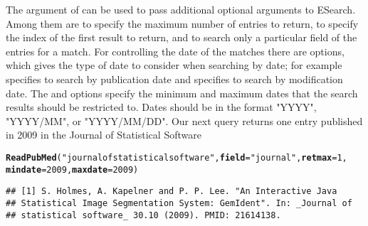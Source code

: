\documentclass[article]{jss}\usepackage[]{graphicx}\usepackage[]{color}
\makeatletter
\newcommand{\hlnum}[1]{\textcolor[rgb]{0.125,0.125,1}{#1}}%
\newcommand{\hlstr}[1]{\textcolor[rgb]{0.125,0.125,1}{#1}}%
\newcommand{\hlstd}[1]{\textcolor[rgb]{0.251,0.251,0.282}{#1}}%
\newcommand{\hlkwc}[1]{\textcolor[rgb]{0.529,0,0.184}{\textbf{#1}}}%
\newcommand{\hlkwd}[1]{\textcolor[rgb]{0.251,0.251,0.282}{\textbf{#1}}}%
\newenvironment{kframe}{%
 \def\at@end@of@kframe{}%
 \ifinner\ifhmode%
  \def\at@end@of@kframe{\end{minipage}}%
  \begin{minipage}{\columnwidth}%
 \fi\fi%
 \def\FrameCommand##1{\hskip\@totalleftmargin \hskip-\fboxsep
 \colorbox{shadecolor}{##1}\hskip-\fboxsep
     \hskip-\linewidth \hskip-\@totalleftmargin \hskip\columnwidth}%
 \MakeFramed {\advance\hsize-\width
   \@totalleftmargin\z@ \linewidth\hsize
   \@setminipage}}%
 {\par\unskip\endMakeFramed%
 \at@end@of@kframe}
\newenvironment{knitrout}{}{} %
\makeatother
\begin{document}
The  argument of  can be used to pass additional optional arguments to ESearch.  Among them are  to specify the maximum number of entries to return,  to specify the index of the first result to return, and  to search only a particular field of the entries for a match.  For controlling the date of the matches there are options,  which gives the type of date to consider when searching by date; for example  specifies to search by publication date and  specifies to search by modification date.  The  and  options specify the minimum and maximum dates that the search results should be restricted to.  Dates should be in the format "YYYY", "YYYY/MM", or "YYYY/MM/DD".  Our next query returns one entry published in 2009 in the Journal of Statistical Software
\begin{knitrout}
\color{fgcolor}\begin{kframe}
\begin{alltt}
\hlkwd{ReadPubMed}\hlstd{(}\hlstr{"journal of statistical software"}\hlstd{,} \hlkwc{field} \hlstd{=} \hlstr{"journal"}\hlstd{,} \hlkwc{retmax} \hlstd{=} \hlnum{1}\hlstd{,}
    \hlkwc{mindate} \hlstd{=} \hlnum{2009}\hlstd{,} \hlkwc{maxdate} \hlstd{=} \hlnum{2009}\hlstd{)}
\end{alltt}
\begin{verbatim}
## [1] S. Holmes, A. Kapelner and P. P. Lee. "An Interactive Java
## Statistical Image Segmentation System: GemIdent". In: _Journal of
## statistical software_ 30.10 (2009). PMID: 21614138.
\end{verbatim}
\end{kframe}
\end{knitrout}
\end{document}
